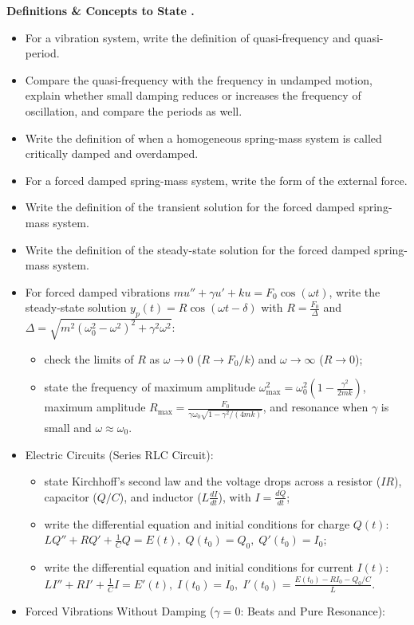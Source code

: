\documentclass{../../../templates/natsirt}
\newcounter{topic}[section]
\newenvironment{recallbox}[1][]{%
    \begin{bluebox}[#1]\refstepcounter{topic}\textbf{Definitions \& Concepts to State \thesection.\thetopic}%
}{\end{bluebox}}
\newcommand{\citem}{\item[$\square$]}
\begin{document}
\begin{recallbox}
\begin{itemize}
    \citem For a vibration system, write the definition of quasi-frequency and quasi-period.
    \citem Compare the quasi-frequency with the frequency in undamped motion, explain whether small damping reduces or increases the frequency of oscillation, and compare the periods as well.
    \citem Write the definition of when a homogeneous spring-mass system is called critically damped and overdamped.
    \citem For a forced damped spring-mass system, write the form of the external force.
    \citem Write the definition of the transient solution for the forced damped spring-mass system.
    \citem Write the definition of the steady-state solution for the forced damped spring-mass system.
    \citem For forced damped vibrations $mu'' + \gamma u' + ku = F_0\cos(\omega t)$, write the steady-state solution $y_p(t) = R\cos(\omega t - \delta)$ with $R = \frac{F_0}{\Delta}$ and $\Delta = \sqrt{m^2(\omega_0^2 - \omega^2)^2 + \gamma^2\omega^2}$:
    \begin{itemize}
        \item check the limits of $R$ as $\omega \to 0$ ($R \to F_0/k$) and $\omega \to \infty$ ($R \to 0$);
        \item state the frequency of maximum amplitude $\omega_{\max}^2 = \omega_0^2\!\left(1 - \frac{\gamma^2}{2mk}\right)$, maximum amplitude $R_{\max} = \frac{F_0}{\gamma\omega_0\sqrt{1 - \gamma^2/(4mk)}}$, and resonance when $\gamma$ is small and $\omega \approx \omega_0$.
    \end{itemize}
    \citem Electric Circuits (Series RLC Circuit):
    \begin{itemize}
        \item state Kirchhoff's second law and the voltage drops across a resistor ($IR$), capacitor ($Q/C$), and inductor ($L\frac{dI}{dt}$), with $I = \frac{dQ}{dt}$;
        \item write the differential equation and initial conditions for charge $Q(t)$: $LQ'' + RQ' + \frac{1}{C}Q = E(t), \; Q(t_0) = Q_0, \; Q'(t_0) = I_0$;
        \item write the differential equation and initial conditions for current $I(t)$: $LI'' + RI' + \frac{1}{C}I = E'(t), \; I(t_0) = I_0, \; I'(t_0) = \frac{E(t_0) - RI_0 - Q_0/C}{L}$.
    \end{itemize}
    \citem Forced Vibrations Without Damping ($\gamma = 0$: Beats and Pure Resonance):
    \begin{itemize}

\end{itemize}
\end{itemize}
\end{recallbox}
\end{document}
